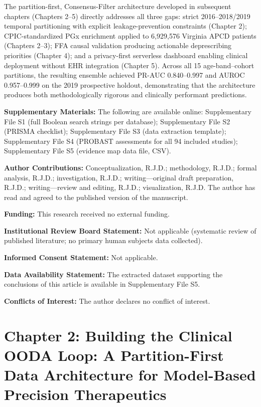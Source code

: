 \documentclass[
  12pt,
]{book}
\begin{document}
The partition-first, Consensus-Filter architecture developed in
subsequent chapters (Chapters 2--5) directly addresses all three gaps:
strict 2016--2018/2019 temporal partitioning with explicit
leakage-prevention constraints (Chapter 2); CPIC-standardized PGx
enrichment applied to 6,929,576 Virginia APCD patients (Chapters 2--3);
FFA causal validation producing actionable deprescribing priorities
(Chapter 4); and a privacy-first serverless dashboard enabling clinical
deployment without EHR integration (Chapter 5). Across all 15
age-band--cohort partitions, the resulting ensemble achieved PR-AUC
0.840--0.997 and AUROC 0.957--0.999 on the 2019 prospective holdout,
demonstrating that the architecture produces both methodologically
rigorous and clinically performant predictions.

\textbf{Supplementary Materials:} The following are available online:
Supplementary File S1 (full Boolean search strings per database);
Supplementary File S2 (PRISMA checklist); Supplementary File S3 (data
extraction template); Supplementary File S4 (PROBAST assessments for all
94 included studies); Supplementary File S5 (evidence map data file,
CSV).

\textbf{Author Contributions:} Conceptualization, R.J.D.; methodology,
R.J.D.; formal analysis, R.J.D.; investigation, R.J.D.;
writing---original draft preparation, R.J.D.; writing---review and
editing, R.J.D.; visualization, R.J.D. The author has read and agreed to
the published version of the manuscript.

\textbf{Funding:} This research received no external funding.

\textbf{Institutional Review Board Statement:} Not applicable
(systematic review of published literature; no primary human subjects
data collected).

\textbf{Informed Consent Statement:} Not applicable.

\textbf{Data Availability Statement:} The extracted dataset supporting
the conclusions of this article is available in Supplementary File S5.

\textbf{Conflicts of Interest:} The author declares no conflict of
interest.

\cleardoublepage

\chapter{Chapter 2: Building the Clinical OODA Loop: A Partition-First
Data Architecture for Model-Based Precision Therapeutics}\label{chap-2}
\end{document}
